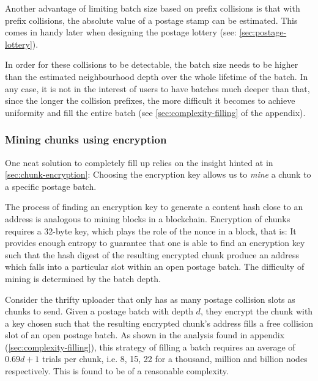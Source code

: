 Another advantage of limiting batch size based on prefix collisions is that with prefix collisions, the absolute value of a postage stamp can be estimated. This comes in handy later when designing the postage lottery (see: \ref{sec:postage-lottery}). 


In order for these collisions to be detectable, the batch size needs to be higher than the estimated neighbourhood depth over the whole lifetime of the batch. In any case, it is not in the interest of users to have batches much deeper than that, since the longer the collision prefixes, the more difficult it becomes to achieve uniformity and fill the entire batch  (see \ref{sec:complexity-filling} of the appendix). 


\subsubsection{Mining chunks using encryption}

One neat solution to completely fill up  relies on the insight hinted at in \ref{sec:chunk-encryption}: Choosing the encryption key allows us to \emph{mine} a chunk to a specific postage batch.

The process of finding an encryption key to generate a content hash close to an address is analogous to mining blocks in a blockchain. Encryption of chunks requires a 32-byte key, which plays the role of the nonce in a block, that is: It provides enough entropy to guarantee that one is able to find an encryption key such that the hash digest of the resulting encrypted chunk produce an address which falls into a particular slot within an open postage batch. The difficulty of mining is determined by the batch depth. 

Consider the thrifty uploader that only has as many postage collision slots as chunks to send. Given a postage batch with depth $d$, they encrypt the chunk with a key chosen such that the resulting encrypted chunk's address fills a free collision slot of an open postage batch. As shown in the analysis found in appendix  (\ref{sec:complexity-filling}), this strategy of filling a batch requires an average of $0.69d+1$ trials per chunk, i.e. 8, 15, 22 for a thousand, million and billion nodes respectively. This is found to be of a reasonable complexity.


